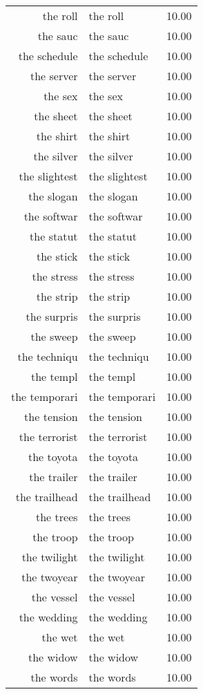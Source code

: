 \begin{table}[ht]
\begin{tabular}{rlr}
  the roll & the roll & 10.00 \\ 
  the sauc & the sauc & 10.00 \\ 
  the schedule & the schedule & 10.00 \\ 
  the server & the server & 10.00 \\ 
  the sex & the sex & 10.00 \\ 
  the sheet & the sheet & 10.00 \\ 
  the shirt & the shirt & 10.00 \\ 
  the silver & the silver & 10.00 \\ 
  the slightest & the slightest & 10.00 \\ 
  the slogan & the slogan & 10.00 \\ 
  the softwar & the softwar & 10.00 \\ 
  the statut & the statut & 10.00 \\ 
  the stick & the stick & 10.00 \\ 
  the stress & the stress & 10.00 \\ 
  the strip & the strip & 10.00 \\ 
  the surpris & the surpris & 10.00 \\ 
  the sweep & the sweep & 10.00 \\ 
  the techniqu & the techniqu & 10.00 \\ 
  the templ & the templ & 10.00 \\ 
  the temporari & the temporari & 10.00 \\ 
  the tension & the tension & 10.00 \\ 
  the terrorist & the terrorist & 10.00 \\ 
  the toyota & the toyota & 10.00 \\ 
  the trailer & the trailer & 10.00 \\ 
  the trailhead & the trailhead & 10.00 \\ 
  the trees & the trees & 10.00 \\ 
  the troop & the troop & 10.00 \\ 
  the twilight & the twilight & 10.00 \\ 
  the twoyear & the twoyear & 10.00 \\ 
  the vessel & the vessel & 10.00 \\ 
  the wedding & the wedding & 10.00 \\ 
  the wet & the wet & 10.00 \\ 
  the widow & the widow & 10.00 \\ 
  the words & the words & 10.00 \\ 

\end{tabular}
\end{table}
